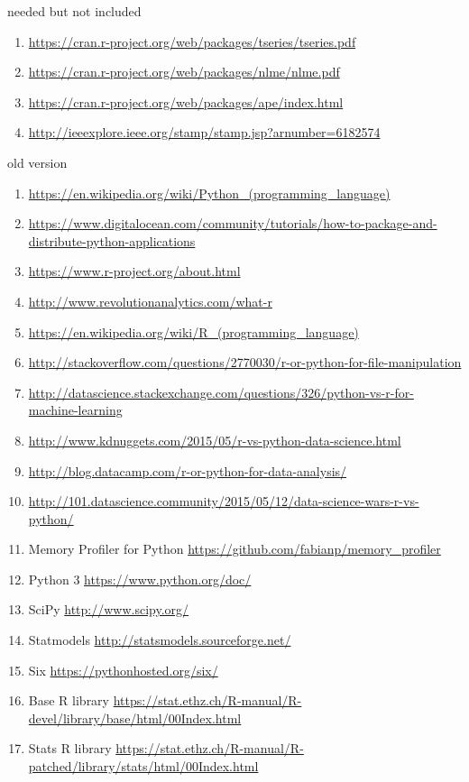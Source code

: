 \documentclass [twoside,
  11pt, a4paper,
  footinclude=true,
  headinclude=true,
  cleardoublepage=empty
]{article}
\begin{document}
needed but not included
\begin{enumerate}
    \item \url{https://cran.r-project.org/web/packages/tseries/tseries.pdf}
    \item \url{https://cran.r-project.org/web/packages/nlme/nlme.pdf}
    \item \url{https://cran.r-project.org/web/packages/ape/index.html}
    \item \url{http://ieeexplore.ieee.org/stamp/stamp.jsp?arnumber=6182574}
    \
\end{enumerate}
old version
\begin{enumerate}
    \item \url{https://en.wikipedia.org/wiki/Python_(programming_language)}
    \item \url{https://www.digitalocean.com/community/tutorials/how-to-package-and-distribute-python-applications}
    \item \url{https://www.r-project.org/about.html}
    \item \url{http://www.revolutionanalytics.com/what-r}
    \item \url{https://en.wikipedia.org/wiki/R_(programming_language)}
    \item \url{http://stackoverflow.com/questions/2770030/r-or-python-for-file-manipulation}
    \item \url{http://datascience.stackexchange.com/questions/326/python-vs-r-for-machine-learning}
    \item \url{http://www.kdnuggets.com/2015/05/r-vs-python-data-science.html}
    \item \url{http://blog.datacamp.com/r-or-python-for-data-analysis/}
    \item \url{http://101.datascience.community/2015/05/12/data-science-wars-r-vs-python/}
    \item Memory Profiler for Python \url{https://github.com/fabianp/memory_profiler} 
    \item Python 3 \url{https://www.python.org/doc/}
    \item SciPy \url{http://www.scipy.org/}
    \item Statmodels \url{http://statsmodels.sourceforge.net/}
    \item Six \url{https://pythonhosted.org/six/}
    \item Base R library \url{https://stat.ethz.ch/R-manual/R-devel/library/base/html/00Index.html}
    \item Stats R library \url{https://stat.ethz.ch/R-manual/R-patched/library/stats/html/00Index.html}

\end{enumerate}
\end{document}
